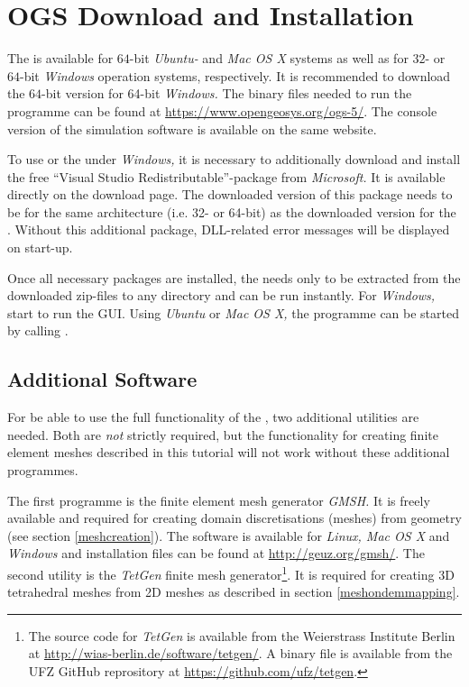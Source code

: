 \section{OGS Download and Installation}

The \ogsde{} is available for $64$-bit \emph{Ubuntu-} and \emph{Mac OS X} systems as well as for $32$- or $64$-bit \emph{Windows} operation systems, respectively. It is recommended to download the $64$-bit version for 64-bit \emph{Windows.} The binary files needed to run the programme can be found at \url{https://www.opengeosys.org/ogs-5/}. The console version of the \ogs{} simulation software is available on the same website.

To use \ogs{} or the \de{} under \emph{Windows,} it is necessary to additionally download and install the free ``Visual Studio Redistributable''-package from \emph{Microsoft.} It is available directly on the \ogs{} download page. The downloaded version of this package needs to be for the same architecture (i.e. 32- or 64-bit) as the downloaded version for the \de{}. Without this additional package, DLL-related error messages will be displayed on start-up.

Once all necessary packages are installed, the \de{} needs only to be extracted from the downloaded zip-files to any directory and can be run instantly. For \emph{Windows,} start  to run the GUI. Using \emph{Ubuntu} or \emph{Mac OS X,} the programme can be started by calling .

\subsection*{Additional Software}

For be able to use the full functionality of the \de{}, two additional utilities are needed. Both are \emph{not} strictly required, but the functionality for creating finite element meshes described in this tutorial will not work without these additional programmes.

The first programme is the finite element mesh generator \emph{GMSH.} It is freely available and required for creating domain discretisations (meshes) from geometry (see section \ref{meshcreation}). The software is available for \emph{Linux, Mac OS X} and \emph{Windows} and installation files can be found at \url{http://geuz.org/gmsh/}. The second utility is the \emph{TetGen} finite mesh generator\footnote{The source code for \emph{TetGen} is available from the Weierstrass Institute Berlin at \url{http://wias-berlin.de/software/tetgen/}. A binary file is available from the UFZ GitHub reprository at \url{https://github.com/ufz/tetgen}.}. It is required for creating 3D tetrahedral meshes from 2D meshes as described in section \ref{meshondemmapping}.

